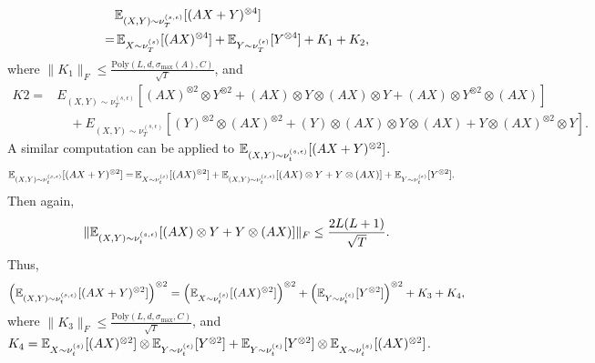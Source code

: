 \begin{align*}
& \mathbb{E}_{(X,Y)\sim \nu_T^{(s,\epsilon)}} [(AX+Y)^{\otimes 4}]\\
 = & \,\mathbb{E}_{X\sim \nu_T^{(s)}}[(AX)^{\otimes 4}] + \mathbb{E}_{Y\sim \nu_T^{(\epsilon)}}[Y^{\otimes 4}] + K_1 +K_2,
\end{align*}
where $\|K_1\|_F \le\frac{\text{Poly}(L, d, \sigma_{\max}(A), C)}{\sqrt{T}} $, and 
\begin{align*}
K2  = & E_{(X,Y)\sim \nu_T^{(s,\epsilon)}} [ (AX)^{\otimes 2}\otimes Y^{\otimes 2} + (AX)\otimes Y\otimes (AX)\otimes Y + (AX)\otimes Y^{\otimes 2}\otimes (AX)]\\
& \quad+  E_{(X,Y)\sim \nu_T^{(s,\epsilon)}} [ (Y)^{\otimes 2}\otimes (AX)^{\otimes 2} + (Y)\otimes (AX)\otimes Y\otimes (AX) + Y\otimes (AX)^{\otimes 2}\otimes Y]. 
\end{align*}
A similar computation can be applied to $\mathbb{E}_{(X,Y)\sim \nu_t^{(s,\epsilon)}} [(AX+Y)^{\otimes 2}]$.
\begin{align*}
\mathbb{E}_{(X,Y)\sim \nu_t^{(s,\epsilon)}} [(AX+Y)^{\otimes 2}]= & \, \mathbb{E}_{X\sim \nu_t^{(s)}}[(AX)^{\otimes 2}] + \mathbb{E}_{(X,Y)\sim \nu_t^{(s,\epsilon)}}[(AX)\otimes Y + Y\otimes (AX)] + \mathbb{E}_{Y\sim \nu_t^{(\epsilon)}}[Y^{\otimes 2}].
\end{align*}
Then again,
\[
\|\mathbb{E}_{(X,Y)\sim \nu_t^{(s,\epsilon)}}[(AX)\otimes Y + Y\otimes (AX)]\|_F \le \frac{2L(L+1)}{\sqrt{T}}.
\]
Thus, 
\[
\left( \mathbb{E}_{(X,Y)\sim \nu_t^{(s,\epsilon)}} [(AX+Y)^{\otimes 2}]\right)^{\otimes2} =  \left(\mathbb{E}_{X\sim \nu_t^{(s)}}[(AX)^{\otimes 2}]\right)^{\otimes2} + \left( \mathbb{E}_{Y\sim \nu_t^{(\epsilon)}}[Y^{\otimes 2}]\right)^{\otimes 2} + K_3+K_4,
\]
where $\|K_3\|_F \le \frac{\text{Poly}(L, d, \sigma_{\max}, C)}{\sqrt{T}}$, and $K_4 = \mathbb{E}_{X\sim \nu_t^{(s)}}[(AX)^{\otimes 2}] \otimes \mathbb{E}_{Y\sim \nu_t^{(\epsilon)}}[Y^{\otimes 2}] + \mathbb{E}_{Y\sim \nu_t^{(\epsilon)}}[Y^{\otimes 2}] \otimes \mathbb{E}_{X\sim \nu_t^{(s)}}[(AX)^{\otimes 2}]$.

